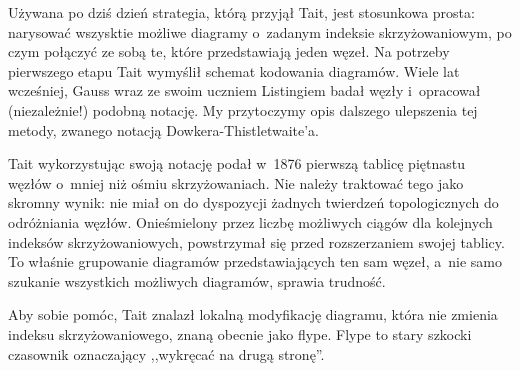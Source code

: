 Używana po dziś dzień strategia, którą przyjął Tait, jest stosunkowa prosta: narysować wszysktie możliwe diagramy o~zadanym indeksie skrzyżowaniowym, po czym połączyć ze sobą te, które przedstawiają jeden węzeł.
Na potrzeby pierwszego etapu Tait wymyślił schemat kodowania diagramów.
Wiele lat wcześniej, Gauss wraz ze swoim uczniem Listingiem badał węzły i~opracował (niezależnie!) podobną notację.
My przytoczymy opis dalszego ulepszenia tej metody, zwanego notacją Dowkera-Thistletwaite’a.

Tait wykorzystując swoją notację podał w~1876 pierwszą tablicę piętnastu węzłów o~mniej niż ośmiu skrzyżowaniach.
Nie należy traktować tego jako skromny wynik: nie miał on do dyspozycji żadnych twierdzeń topologicznych do odróżniania węzłów.
Onieśmielony przez liczbę możliwych ciągów dla kolejnych indeksów skrzyżowaniowych, powstrzymał się przed rozszerzaniem swojej tablicy.
To właśnie grupowanie diagramów przedstawiających ten sam węzeł, a~nie samo szukanie wszystkich możliwych diagramów, sprawia trudność.

Aby sobie pomóc, Tait znalazł lokalną modyfikację diagramu, która nie zmienia indeksu skrzyżowaniowego, znaną obecnie jako flype.
Flype to stary szkocki czasownik oznaczający ,,wykręcać na drugą stronę''.

